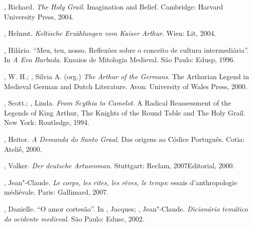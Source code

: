\begin{bibliohedra}

, Richard. \textit{ The Holy Grail}. Imagination and Belief. Cambridge:
Harvard University Press, 2004.

, Helmut. \textit{Keltische Erzählungen vom Kaiser Arthur}. Wien: Lit,
2004.

, Hilário. “Meu, teu, nosso. Reflexões sobre o conceito de cultura
intermediária”. In \textit{A Eva Barbada. }Ensaios de Mitologia Medieval. São
Paulo: Edusp, 1996.

, W. H.; , Silvia A. (org.) \textit{The Arthur of the Germans}. The
Arthurian Legend in Medieval German and Dutch Literature. Avon: University of
Wales Press, 2000. 

, Scott.; , Linda. \textit{From Scythia to Camelot}. A Radical
Reassessment of the Legends of King Arthur, The Knights of the Round Table and
The Holy Grail. New York: Routledge, 1994.

, Heitor. \textit{A Demanda do Santo Graal}. Das origens ao Códice
Português. Cotia: Ateliê, 2000.

, Volker. \textit{Der deutsche Artusroman}. Stuttgart: Reclam,
2007Editorial, 2000.

, Jean"-Claude. \textit{Le corps, les rites, les rêves, le temps}: essais
d’anthropologie médiévale. Paris: Gallimard, 2007.

, Danielle. “O amor cortesão”. In , Jacques; ,
Jean"-Claude. \textit{Dicionário temático do ocidente medieval}. São Paulo:
Edusc, 2002.
\end{bibliohedra}


